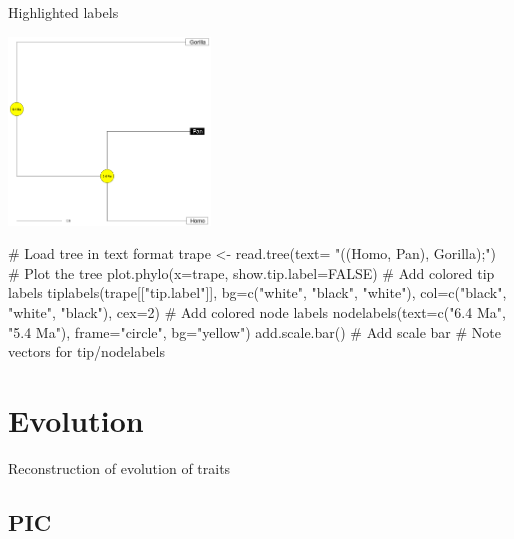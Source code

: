 \documentclass[compress, ucs, xelatex, 11pt, xcolor=svgnames,
  hyperref={
    bookmarks=true,
    unicode=true,
    colorlinks=true,
    pdftitle={Molecular data in R},
    plainpages=false,
    pdfauthor={Vojtech Zeisek},
    pdfsubject={Course about phylogeny and evolution in R},
    pdfcreator={XeLaTeX},
    pdfkeywords={R, evolution, phylogeny, molecular data},
    linkcolor=Tomato,
    anchorcolor=SaddleBrown,
    citecolor=Goldenrod,
    filecolor=DarkMagenta,
    menucolor=Sienna,
    urlcolor=DarkTurquoise,
    pdftex},
  url={hyphens, lowtilde} %
  ]{beamer}
\begin{document}
\begin{frame}[fragile]{Highlighted labels}
\begin{multicols}{2}
  \vfill
  \includegraphics[height=5cm]{highlight.png}
  \vfill
  \begin{spluscode}
    # Load tree in text format
    trape <- read.tree(text=
      "((Homo, Pan), Gorilla);")
    # Plot the tree
    plot.phylo(x=trape,
      show.tip.label=FALSE)
    # Add colored tip labels
    tiplabels(trape[["tip.label"]],
      bg=c("white", "black",
      "white"), col=c("black",
      "white", "black"), cex=2)
    # Add colored node labels
    nodelabels(text=c("6.4 Ma",
      "5.4 Ma"), frame="circle",
      bg="yellow")
    add.scale.bar() # Add scale bar
    # Note vectors for tip/nodelabels
  \end{spluscode}
\end{multicols}
\end{frame}

\section{Evolution}

\begin{frame}{Reconstruction of evolution of traits}
  \tableofcontents[currentsection, sectionstyle=show/hide, hideothersubsections]
\end{frame}


\subsection{PIC}
\end{document}
